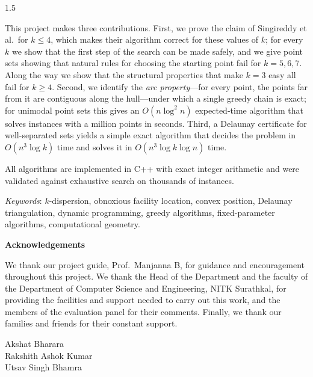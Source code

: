 \documentclass[12pt,oneside,openany]{report}
\theoremstyle{definition}
\theoremstyle{remark}
\newcommand{\StudentA}{Akshat Bharara}
\newcommand{\StudentB}{Rakshith Ashok Kumar}
\newcommand{\StudentC}{Utsav Singh Bhamra}
\newcommand{\Guide}{Prof.\ Manjanna B}
\newcommand{\Department}{Computer Science and Engineering}
\begin{document}
\begin{spacing}{1.5}
\begin{titlepage}
\begin{singlespacing}
This project makes three contributions. First, we prove the claim of
Singireddy et al.\ for $k\le4$, which makes their algorithm correct for these
values of $k$; for every $k$ we show that the first step of the search can be
made safely, and we give point sets showing that natural rules for choosing the
starting point fail for $k=5,6,7$. Along the way we show that the structural
properties that make $k=3$ easy all fail for $k\ge4$. Second, we identify the
\emph{arc property}---for every point, the points far from it are contiguous
along the hull---under which a single greedy chain is exact; for unimodal point
sets this gives an $O(n\log^2n)$ expected-time algorithm that solves instances
with a million points in seconds. Third, a Delaunay certificate for
well-separated sets yields a simple exact algorithm that decides the problem in
$O(n^3\log k)$ time and solves it in $O(n^3\log k\log n)$ time.

All algorithms are implemented in C++ with exact integer arithmetic and were
validated against exhaustive search on thousands of instances.

\vspace*{12pt}
\noindent \textit{Keywords}: $k$-dispersion, obnoxious facility location,
convex position, Delaunay triangulation, dynamic programming, greedy
algorithms, fixed-parameter algorithms, computational geometry.
\end{singlespacing}
\end{titlepage}

\newpage
\begin{titlepage}
\pagestyle{empty}
\begin{center}
\large \textbf{Acknowledgements}
\end{center}

We thank our project guide, \Guide, for guidance and encouragement throughout
this project. We thank the Head of the Department and the faculty of the
Department of \Department, NITK Surathkal, for providing the facilities and
support needed to carry out this work, and the members of the evaluation panel
for their comments. Finally, we thank our families and friends for their
constant support.

\vspace*{0.5in}
\hfill \StudentA\\
\hspace*{\fill} \StudentB\\
\hspace*{\fill} \StudentC
\end{titlepage}


\end{spacing}
\end{document}
